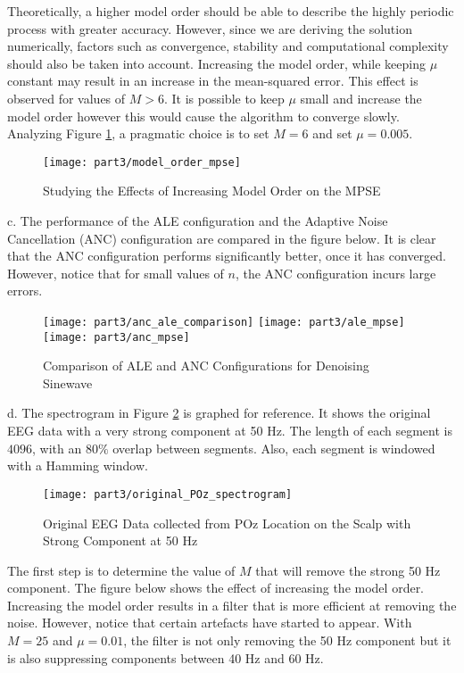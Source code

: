 \noindent{}Theoretically, a higher model order should be able to describe the highly periodic process with greater accuracy. However, since we are deriving the solution numerically, factors such as convergence, stability and computational complexity should also be taken into account. Increasing the model order, while keeping $\mu$ constant may result in an increase in the mean-squared error. This effect is observed for values of $M>6$. It is possible to keep $\mu$ small and increase the model order however this would cause the algorithm to converge slowly. Analyzing Figure \ref{fig:ale_model}, a pragmatic choice is to set $M=6$ and set $\mu=0.005$.

\begin{figure}[H]
\centering{}
\texttt{[image: part3/model\_order\_mpse]}
\caption{Studying the Effects of Increasing Model Order on the MPSE}
\label{fig:ale_model}
\end{figure}

\noindent{}c. The performance of the ALE configuration and the Adaptive Noise Cancellation (ANC) configuration are compared in the figure below. It is clear that the ANC configuration performs significantly better, once it has converged. However, notice that for small values of $n$, the ANC configuration incurs large errors.

\begin{figure}[H]
\centering{}
\texttt{[image: part3/anc\_ale\_comparison]}
\texttt{[image: part3/ale\_mpse]}
\texttt{[image: part3/anc\_mpse]}
\caption{Comparison of ALE and ANC Configurations for Denoising Sinewave}
\end{figure}

\noindent{}d. The spectrogram in Figure \ref{fig:ref_spect} is graphed for reference. It shows the original EEG data with a very strong component at 50 Hz. The length of each segment is $4096$, with an $80\%$ overlap between segments. Also, each segment is windowed with a Hamming window. 

\begin{figure}[H]
\centering{}
\texttt{[image: part3/original\_POz\_spectrogram]}
\caption{Original EEG Data collected from POz Location on the Scalp with Strong Component at 50 Hz}
\label{fig:ref_spect}
\end{figure}

\noindent{}The first step is to determine the value of $M$ that will remove the strong 50 Hz component. The figure below shows the effect of increasing the model order. Increasing the model order results in a filter that is more efficient at removing the noise. However, notice that certain artefacts have started to appear. With $M=25$ and $\mu=0.01$, the filter is not only removing the 50 Hz component but it is also suppressing components between 40 Hz and 60 Hz.

